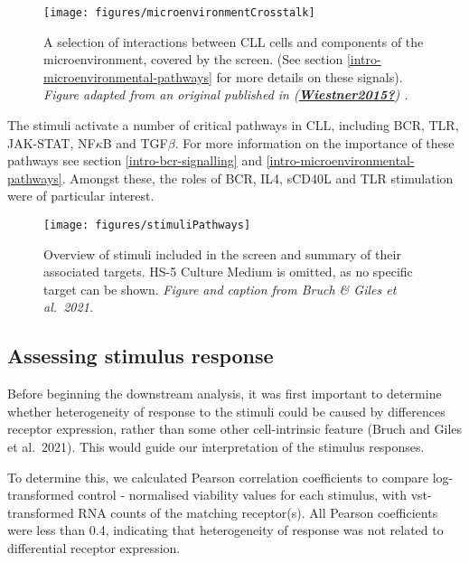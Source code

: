 \documentclass[11pt, a4paper, twosided]{book}
\begin{document}
\begin{figure}

{\centering \texttt{[image: figures/microenvironmentCrosstalk]} 

}

\caption{A selection of interactions between CLL cells and components of the microenvironment, covered by the screen. (See section \ref{intro-microenvironmental-pathways} for more details on these signals). \emph{Figure adapted from an original published in (\protect\hyperlink{ref-Wiestner2015}{\textbf{Wiestner2015?}}) .}}\label{fig:microenvironmentCrosstalk}
\end{figure}
The stimuli activate a number of critical pathways in CLL, including BCR, TLR, JAK-STAT, NF\(\kappa\)B and TGF\(\beta\). For more information on the importance of these pathways see section \ref{intro-bcr-signalling} and \ref{intro-microenvironmental-pathways}. Amongst these, the roles of BCR, IL4, sCD40L and TLR stimulation were of particular interest.


\begin{figure}

{\centering \texttt{[image: figures/stimuliPathways]} 

}

\caption{Overview of stimuli included in the screen and summary of their associated targets. HS-5 Culture Medium is omitted, as no specific target can be shown. \emph{Figure and caption from Bruch \& Giles et al.~2021.}}\label{fig:stimuliPathways}
\end{figure}
\hypertarget{assessing-stimulus-response}{%
\subsection{Assessing stimulus response}\label{assessing-stimulus-response}}

Before beginning the downstream analysis, it was first important to determine whether heterogeneity of response to the stimuli could be caused by differences receptor expression, rather than some other cell-intrinsic feature (Bruch and Giles et al.~2021). This would guide our interpretation of the stimulus responses.

To determine this, we calculated Pearson correlation coefficients to compare log-transformed control - normalised viability values for each stimulus, with vst-transformed RNA counts of the matching receptor(s). All Pearson coefficients were less than 0.4, indicating that heterogeneity of response was not related to differential receptor expression.
\end{document}
